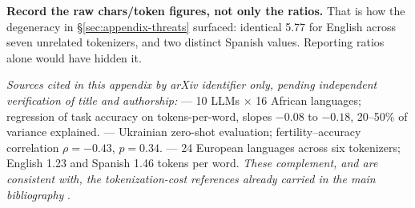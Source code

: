 \textbf{Record the raw chars/token figures, not only the ratios.} That is how the
degeneracy in \S\ref{sec:appendix-threats} surfaced: identical 5.77 for English
across seven unrelated tokenizers, and two distinct Spanish values. Reporting
ratios alone would have hidden it.

\bigskip

\noindent\emph{Sources cited in this appendix by arXiv identifier only, pending
independent verification of title and authorship:}
\citet{anon2025fertilityafrican} --- 10 LLMs \(\times\) 16 African languages;
regression of task accuracy on tokens-per-word, slopes $-0.08$ to $-0.18$,
20--50\% of variance explained. \citet{anon2026ukrainianfertility} --- Ukrainian
zero-shot evaluation; fertility--accuracy correlation $\rho = -0.43$,
$p = 0.34$. \citet{anon2026europeantokenizers} --- 24 European languages across
six tokenizers; English 1.23 and Spanish 1.46 tokens per word.
\emph{These complement, and are consistent with, the tokenization-cost
references already carried in the main bibliography}
\citep{petrov2023tokenizerunfairness,nayeem2025strr}.
